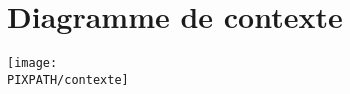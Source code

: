 \section{Diagramme de contexte}

\begin{center}
\texttt{[image: \\PIXPATH/contexte]}
\end{center}

\vfill
\pagebreak
